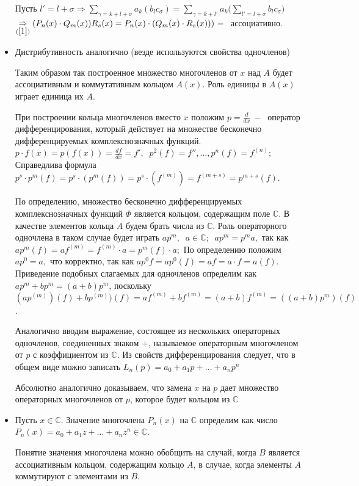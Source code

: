 \begin{itemize}
    Пусть $l'=l+\sigma\Rightarrow\displaystyle\sum_{\gamma=k+l+\sigma}a_k(b_lc_\sigma) =\displaystyle\sum_{\gamma=k+l'}a_k\Big(\displaystyle\sum_{l'=l+\sigma}b_lc_\sigma\Big)$ 
    $\underset{(\ref{1})}{\Rightarrow} (P_n(x)\cdot Q_m(x) )R_s(x)=P_n(x)\cdot(Q_m(x)\cdot R_s(x)))~-~$ ассоциативно.
    \item Дистрибутивность аналогично (везде используются свойства одночленов)\par Таким образом так построенное множество многочленов от $x$ над $A$ будет ассоциативным и коммутативным кольцом $A(x)$. Роль единицы в $A(x)$ играет единица их $A$.\par
    При построении кольца многочленов вместо $x$ положим $p=\frac{d}{dx}~-~$ оператор дифференцирования, который действует на множестве бесконечно дифференцируемых комплекснозначных функций. $p\cdot f(x)=p(f(x))=\frac{df}{dx}=f', \;\;p^2(f)=f'', \dots, p^n(f)=f^{(n)};$ Справедлива формула $p^s\cdot p^m(f)=p^s\cdot (p^m(f))=p^s\cdot (f^{(m)})=f^{(m+s)}=p^{m+s}(f)$.\par
    По определению, множество бесконечно дифференцируемых комплекснозначных функций $\varPhi$ является кольцом, содержащим поле $\mathds{C}$. В качестве элементов кольца $A$ будем брать  числа из $\mathds{C}$.
    Роль операторного одночлена в таком случае будет играть $ap^m, \;\;a\in\mathds{C};\;\;ap^m=p^ma, $ так как $ap^m(f)=af^{(m)}=f^{(m)}\cdot a = p^m(f)\cdot a;$ По определению положим $ap^0=a, $ что корректно, так как $ap^0f=ap^0(f)=af=a\cdot f=a(f).$ Приведение подобных слагаемых для одночленов определим как $ap^m+bp^m=(a+b)p^m$, поскольку $(ap^{(m)})(f)+bp^{(m)})(f)=af^{(m)}+bf^{(m)}=(a+b)f^{(m)}=((a+b)p^m)(f)$.\par
    Аналогично вводим выражение, состоящее из нескольких операторных одночленов, соединенных знаком $+$, называемое операторным многочленом от $p$ с коэффициентом из $\mathds{C}$. Из свойств дифференцирования следует, что в общем виде можно записать $L_n(p)=a_0+a_1p+\dots+a_np^n$\par
    Абсолютно аналогично доказываем, что замена $x$ на $p$ дает множество операторных многочленов от $p$, которое будет кольцом из $\mathds{C}$
    \item Пусть $x \in \mathds{C}$. Значение многочлена $P_n(x)$ на $\mathds{C}$ определим как число $P_n(x) = a_0 + a_1 z + \dots + a_n z^{n} \in \mathds{C}$. \par
    Понятие значения многочлена можно обобщить на случай, когда $B$ является ассоциативным кольцом, содержащим кольцо $A$, в случае, когда элементы $A$ коммутируют с элементами из $B$.\par

\end{itemize}
